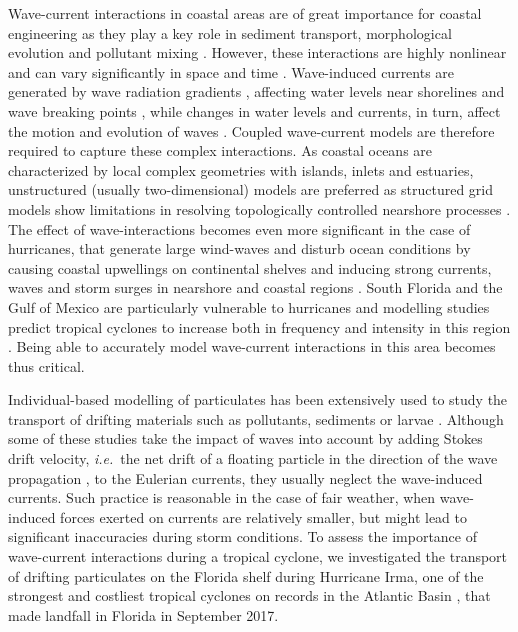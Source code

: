 \documentclass[11pt,a4paper]{article}
\newcommand{\ie}{{\it i.e.}\ }
\begin{document}
Wave-current interactions in coastal areas are of great importance for coastal engineering as they play a key role in sediment transport, morphological evolution and pollutant mixing \citep{bever2013simulating, li1998three}. However, these interactions are highly nonlinear and can vary significantly in space and time \citep{wu2011fvcom}. Wave-induced currents are generated by wave radiation gradients \citep{longuet1970longshore}, affecting water levels near shorelines and wave breaking points \citep{longuet1964radiation}, while changes in water levels and currents, in turn, affect the motion and evolution of waves \citep{sikiric2013coupling}. Coupled wave-current models are therefore required to capture these complex interactions. As coastal oceans are characterized by local complex geometries with islands, inlets and estuaries, unstructured (usually two-dimensional) models are preferred as structured grid models show limitations in resolving topologically controlled nearshore processes \citep{wu2011fvcom, chen2007finite}. The effect of wave-interactions becomes even more significant in the case of hurricanes, that generate large wind-waves and disturb ocean conditions \citep{liu2020impacts} by causing coastal upwellings on continental shelves \citep{smith1982response} and inducing strong currents, waves and storm surges in nearshore and coastal regions \citep{dietrich2010high, weisberg2006hurricane}. South Florida and the Gulf of Mexico are particularly vulnerable to hurricanes \citep{malmstadt2009florida} and modelling studies predict tropical cyclones to increase both in frequency and intensity in this region \citep{marsooli2019climate, knutson2010tropical}. Being able to accurately model wave-current interactions in this area becomes thus critical.

Individual-based modelling of particulates has been extensively used to study the transport of drifting materials such as pollutants, sediments or larvae \citep{garcia2020measuring,liubartseva2018tracking, figueiredo2013synthesizing, frys2020fine}. Although some of these studies take the impact of waves into account by adding Stokes drift velocity, \ie the net drift of a floating particle in the direction of the wave propagation \citep{van2018stokes}, to the Eulerian currents, they usually neglect the wave-induced currents. Such practice is reasonable in the case of fair weather, when wave-induced forces exerted on currents are relatively smaller, but might lead to significant inaccuracies during storm conditions. To assess the importance of wave-current interactions during a tropical cyclone, we investigated the transport of drifting particulates on the Florida shelf during Hurricane Irma, one of the strongest and costliest tropical cyclones on records in the Atlantic Basin \citep{chen2007finite}, that made landfall in Florida in September 2017.
\end{document}
